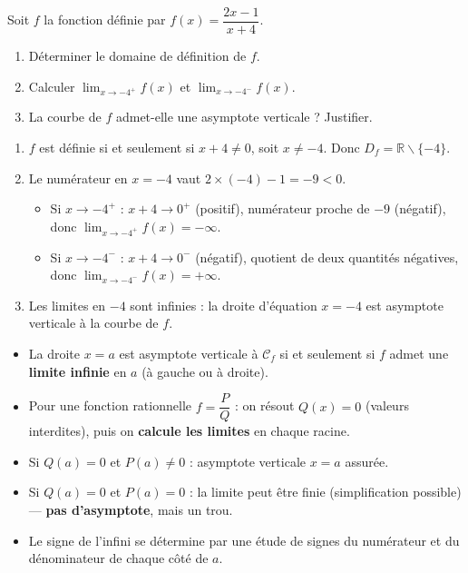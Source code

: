 \documentclass[11pt]{article}
\newcommand{\cle}[1]{{\popxbold\color{popdark}#1}}
\def\setminus{\mathbin{\backslash}}\let\smallsetminus\setminus
\begin{document}
\begin{exercice}
Soit $f$ la fonction définie par $f(x)=\dfrac{2x-1}{x+4}$.
\begin{enumerate}
\item Déterminer le domaine de définition de $f$.
\item Calculer $\lim_{x\to -4^{+}} f(x)$ et $\lim_{x\to -4^{-}} f(x)$.
\item La courbe de $f$ admet-elle une asymptote verticale ? Justifier.
\end{enumerate}
\end{exercice}

\begin{corrige}[Exercice 1]
\begin{enumerate}
\item $f$ est définie si et seulement si $x+4\neq 0$, soit $x\neq -4$. Donc $D_f=\mathbb{R}\setminus\{-4\}$.
\item Le numérateur en $x=-4$ vaut $2\times(-4)-1=-9<0$.
\begin{itemize}
\item Si $x\to -4^{+}$ : $x+4\to 0^{+}$ (positif), numérateur proche de $-9$ (négatif), donc $\lim_{x\to -4^{+}} f(x)=-\infty$.
\item Si $x\to -4^{-}$ : $x+4\to 0^{-}$ (négatif), quotient de deux quantités négatives, donc $\lim_{x\to -4^{-}} f(x)=+\infty$.
\end{itemize}
\item Les limites en $-4$ sont infinies : la droite d'équation $x=-4$ est asymptote verticale à la courbe de $f$.
\end{enumerate}
\end{corrige}

\begin{aretenir}
\begin{itemize}
\item La droite $x=a$ est \cle{asymptote verticale} à $\mathcal{C}_f$ si et seulement si $f$ admet une \textbf{limite infinie} en $a$ (à gauche ou à droite).
\item Pour une fonction rationnelle $f=\dfrac{P}{Q}$ : on résout $Q(x)=0$ (valeurs interdites), puis on \textbf{calcule les limites} en chaque racine.
\item Si $Q(a)=0$ et $P(a)\neq 0$ : asymptote verticale $x=a$ assurée.
\item Si $Q(a)=0$ et $P(a)=0$ : la limite peut être finie (simplification possible) — \textbf{pas d'asymptote}, mais un trou.
\item Le signe de l'infini se détermine par une étude de signes du numérateur et du dénominateur de chaque côté de $a$.
\end{itemize}
\end{aretenir}
\end{document}
